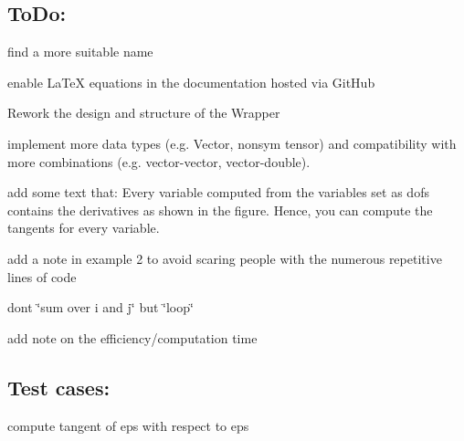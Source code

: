 \subsection*{To\+Do\+:}


\begin{DoxyItemize}
\item find a more suitable name
\item enable La\+TeX equations in the documentation hosted via Git\+Hub
\item Rework the design and structure of the Wrapper
\item implement more data types (e.\+g. Vector, nonsym tensor) and compatibility with more combinations (e.\+g. vector-\/vector, vector-\/double).
\item add some text that\+: Every variable computed from the variables set as dofs contains the derivatives as shown in the figure. Hence, you can compute the tangents for every variable.
\item add a note in example 2 to avoid scaring people with the numerous repetitive lines of code
\item don\textquotesingle{}t \char`\"{}sum over i and j\char`\"{} but \char`\"{}loop\char`\"{}
\item add note on the efficiency/computation time
\end{DoxyItemize}

\subsection*{Test cases\+:}


\begin{DoxyItemize}
\item compute tangent of eps with respect to eps 
\end{DoxyItemize}